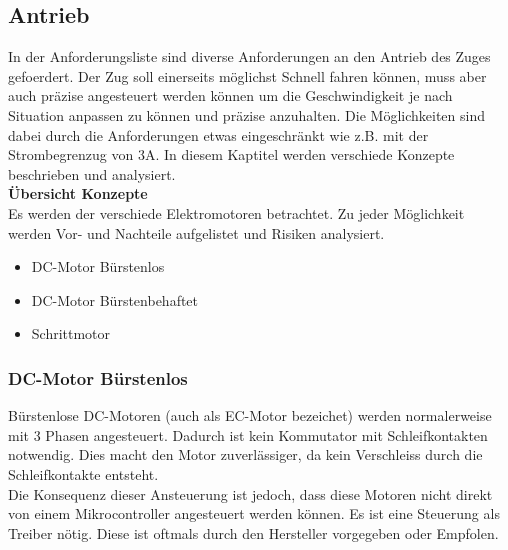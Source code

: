 \documentclass[../../main.tex]{subfiles}
\begin{document}
    \subsection{Antrieb}
    In der Anforderungsliste sind diverse Anforderungen an den Antrieb des Zuges gefoerdert.
    Der Zug soll einerseits möglichst Schnell fahren können, muss aber auch präzise angesteuert werden können um die Geschwindigkeit je nach Situation anpassen zu können und präzise anzuhalten.
    Die Möglichkeiten sind dabei durch die Anforderungen etwas eingeschränkt wie z.B. mit der Strombegrenzug von 3A.
    In diesem Kaptitel werden verschiede Konzepte beschrieben und analysiert.\\

    \textbf{Übersicht Konzepte}\\
    Es werden der verschiede Elektromotoren betrachtet. Zu jeder Möglichkeit werden Vor- und Nachteile aufgelistet und Risiken analysiert.

    \begin{itemize}
        \item DC-Motor Bürstenlos
        \item DC-Motor Bürstenbehaftet
        \item Schrittmotor
    \end{itemize}
    \subsubsection{DC-Motor Bürstenlos}

    Bürstenlose DC-Motoren (auch als EC-Motor bezeichet) werden normalerweise mit 3 Phasen angesteuert. Dadurch ist kein Kommutator mit Schleifkontakten notwendig. Dies macht den Motor zuverlässiger, da kein Verschleiss durch die Schleifkontakte entsteht.\\
    Die Konsequenz dieser Ansteuerung ist jedoch, dass diese Motoren nicht direkt von einem Mikrocontroller angesteuert werden können. Es ist eine Steuerung als Treiber nötig. Diese ist oftmals durch den Hersteller vorgegeben oder Empfolen.\\
\end{document}

